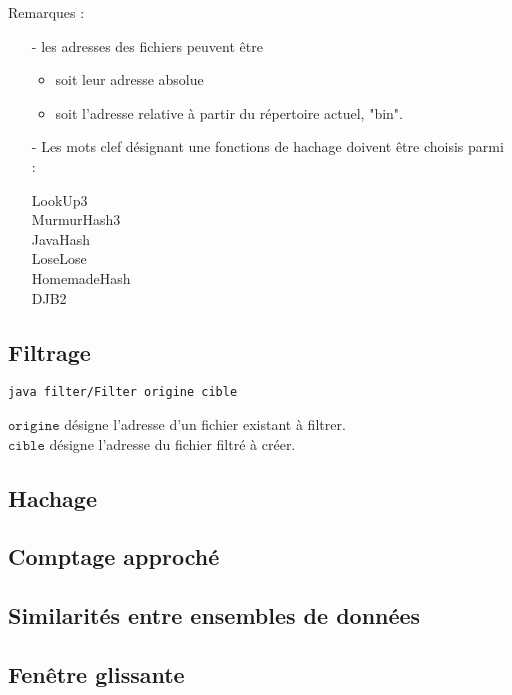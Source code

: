 \documentclass[12pt,a4paper,titlepage]{article}
\newcommand{\class}[1]{$\mathtt{#1}$}
\begin{document}
Remarques :
\begin{itemize}
\item[-] les adresses des fichiers peuvent être
	\begin{itemize}
	\item soit leur adresse absolue
	\item soit l'adresse relative à partir du répertoire actuel, "bin".
	\end{itemize}
\item[-] Les mots clef désignant une fonctions de hachage doivent être choisis parmi :
	\begin{center}
	LookUp3 \\
	MurmurHash3 \\
	JavaHash \\
	LoseLose \\
	HomemadeHash \\
	DJB2
	\end{center}
\end{itemize}



\subsection{Filtrage}
\begin{lstlisting}
java filter/Filter origine cible
\end{lstlisting}
\class{origine} désigne l'adresse d'un fichier existant à filtrer.\\
\class{cible} désigne l'adresse du fichier filtré à créer.\\


\subsection{Hachage}

\subsection{Comptage approché}

\subsection{Similarités entre ensembles de données}

\subsection{Fenêtre glissante}
\end{document}
